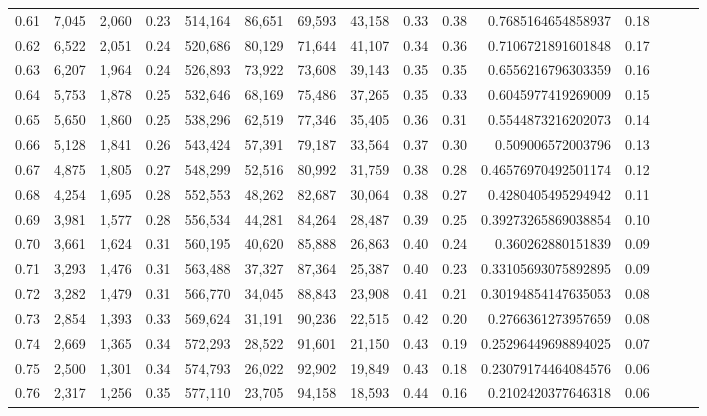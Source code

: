 \begin{tabular}{rrrrrrrrrrrrrrr}
0.61 &   7,045 &  2,060 &  0.23 &  514,164 &   86,651 &   69,593 &   43,158 &  0.33 &  0.38 &     0.7685164654858937 &      0.18 \\
0.62 &   6,522 &  2,051 &  0.24 &  520,686 &   80,129 &   71,644 &   41,107 &  0.34 &  0.36 &     0.7106721891601848 &      0.17 \\
0.63 &   6,207 &  1,964 &  0.24 &  526,893 &   73,922 &   73,608 &   39,143 &  0.35 &  0.35 &     0.6556216796303359 &      0.16 \\
0.64 &   5,753 &  1,878 &  0.25 &  532,646 &   68,169 &   75,486 &   37,265 &  0.35 &  0.33 &     0.6045977419269009 &      0.15 \\
0.65 &   5,650 &  1,860 &  0.25 &  538,296 &   62,519 &   77,346 &   35,405 &  0.36 &  0.31 &     0.5544873216202073 &      0.14 \\
0.66 &   5,128 &  1,841 &  0.26 &  543,424 &   57,391 &   79,187 &   33,564 &  0.37 &  0.30 &      0.509006572003796 &      0.13 \\
0.67 &   4,875 &  1,805 &  0.27 &  548,299 &   52,516 &   80,992 &   31,759 &  0.38 &  0.28 &    0.46576970492501174 &      0.12 \\
0.68 &   4,254 &  1,695 &  0.28 &  552,553 &   48,262 &   82,687 &   30,064 &  0.38 &  0.27 &     0.4280405495294942 &      0.11 \\
0.69 &   3,981 &  1,577 &  0.28 &  556,534 &   44,281 &   84,264 &   28,487 &  0.39 &  0.25 &    0.39273265869038854 &      0.10 \\
0.70 &   3,661 &  1,624 &  0.31 &  560,195 &   40,620 &   85,888 &   26,863 &  0.40 &  0.24 &      0.360262880151839 &      0.09 \\
0.71 &   3,293 &  1,476 &  0.31 &  563,488 &   37,327 &   87,364 &   25,387 &  0.40 &  0.23 &    0.33105693075892895 &      0.09 \\
0.72 &   3,282 &  1,479 &  0.31 &  566,770 &   34,045 &   88,843 &   23,908 &  0.41 &  0.21 &    0.30194854147635053 &      0.08 \\
0.73 &   2,854 &  1,393 &  0.33 &  569,624 &   31,191 &   90,236 &   22,515 &  0.42 &  0.20 &     0.2766361273957659 &      0.08 \\
0.74 &   2,669 &  1,365 &  0.34 &  572,293 &   28,522 &   91,601 &   21,150 &  0.43 &  0.19 &    0.25296449698894025 &      0.07 \\
0.75 &   2,500 &  1,301 &  0.34 &  574,793 &   26,022 &   92,902 &   19,849 &  0.43 &  0.18 &    0.23079174464084576 &      0.06 \\
0.76 &   2,317 &  1,256 &  0.35 &  577,110 &   23,705 &   94,158 &   18,593 &  0.44 &  0.16 &     0.2102420377646318 &      0.06 \\

\end{tabular}
